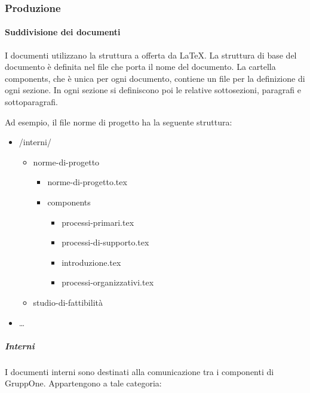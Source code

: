 \documentclass[../norme-di-progetto.tex]{subfiles}
\begin{document}
\subsubsection{Produzione}%
\label{subs:produzione}

\paragraph{Suddivisione dei documenti}%
\label{par:suddivisione_dei_documenti}
I documenti utilizzano la struttura a  offerta da \LaTeX.
La struttura di base del documento è definita nel file che porta il nome del documento.
La cartella components, che è unica per ogni documento, contiene un file per la definizione di ogni sezione. In ogni sezione si definiscono poi le relative sottosezioni, paragrafi e sottoparagrafi.

Ad esempio, il file norme di progetto ha la seguente struttura:

\begin{itemize}
  \item[] /interni/
        \begin{itemize}
          \item norme-di-progetto
                \begin{itemize}
                  \item norme-di-progetto.tex
                  \item components
                        \begin{itemize}
                          \item processi-primari.tex
                          \item processi-di-supporto.tex
                          \item introduzione.tex
                          \item processi-organizzativi.tex
                        \end{itemize}
                \end{itemize}
          \item studio-di-fattibilità
        \end{itemize}
  \item[] \ldots
\end{itemize}

\subparagraph{Interni}%
\label{subp:suddivisione_dei_documenti/interni}
I documenti interni sono destinati alla comunicazione tra i componenti di GruppOne. Appartengono a tale categoria:
\end{document}
